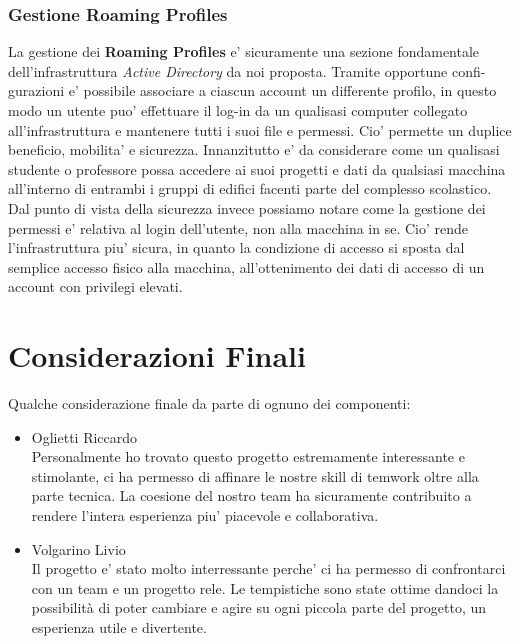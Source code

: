 \documentclass{report}
\begin{document}
			\subsection{Gestione Roaming Profiles}
				La gestione dei \textbf{Roaming Profiles} e' sicuramente una sezione fondamentale dell'infrastruttura
				\emph{Active Directory} da noi proposta. Tramite opportune confi-\\gurazioni e' possibile associare 
				a ciascun account un differente profilo, in questo modo un utente puo' effettuare il log-in da un
				qualisasi computer collegato all'infrastruttura e mantenere tutti i suoi file e permessi.
				Cio' permette un duplice beneficio, mobilita' e sicurezza. Innanzitutto e' da considerare come 
				un qualisasi studente o professore possa accedere ai suoi progetti e dati da qualsiasi macchina 
				all'interno di entrambi i gruppi di edifici facenti parte del complesso scolastico. Dal punto 
				di vista della sicurezza invece possiamo notare come la gestione dei permessi e' relativa al
				login dell'utente, non alla macchina in se. Cio' rende l'infrastruttura piu' sicura, in quanto
				la condizione di accesso si sposta dal semplice accesso fisico alla macchina, all'ottenimento dei
				dati di accesso di un account con privilegi elevati.
	\chapter{Considerazioni Finali}
		Qualche considerazione finale da parte di ognuno dei componenti:
		\begin{itemize}
			\item Oglietti Riccardo\\
				Personalmente ho trovato questo progetto estremamente interessante e stimolante, ci ha permesso di
				affinare le nostre skill di temwork oltre alla parte tecnica. La coesione del nostro team ha
				sicuramente contribuito a rendere l'intera esperienza piu' piacevole e collaborativa.
			\item Volgarino Livio\\
				Il progetto e' stato molto interressante perche' ci ha permesso di confrontarci con un team e un progetto
				rele. Le tempistiche sono state ottime dandoci la possibilità di poter cambiare e agire su ogni piccola
				parte del progetto, un esperienza utile e divertente. 
		\end{itemize}
\end{document}

